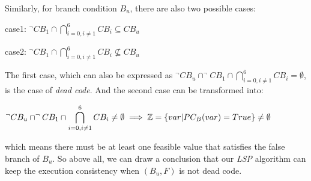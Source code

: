 Similarly, for branch condition $B_u$, there are also two possible cases:
\begin{center}
case1: $\displaystyle ^\neg CB_1 \cap \bigcap\limits_{i=0,i\neq 1}^6 CB_i \subseteq CB_u$

case2: $\displaystyle ^\neg CB_1 \cap \bigcap\limits_{i=0,i\neq 1}^6 CB_i \nsubseteq CB_u$
\end{center}

The first case, which can also be expressed as $^\neg CB_u \cap ^\neg CB_1 \cap \bigcap_{i=0,i\neq 1}^6 CB_i = \emptyset$, is the case of \emph{dead code}. And the second case can be transformed into:
\begin{center}
$\displaystyle ^\neg CB_u \cap ^\neg CB_1 \cap \bigcap\limits_{i=0,i\neq 1}^6 CB_i \neq \emptyset \implies \mathbb{Z} = \{var\arrowvert PC_B(var) = True\} \neq \emptyset$
\end{center}

\noindent which means there must be at least one feasible value that satisfies the false branch of $B_u$. So above all, we can draw a conclusion that our \emph{LSP} algorithm can keep the execution consistency when $(B_u, F)$ is not dead code.